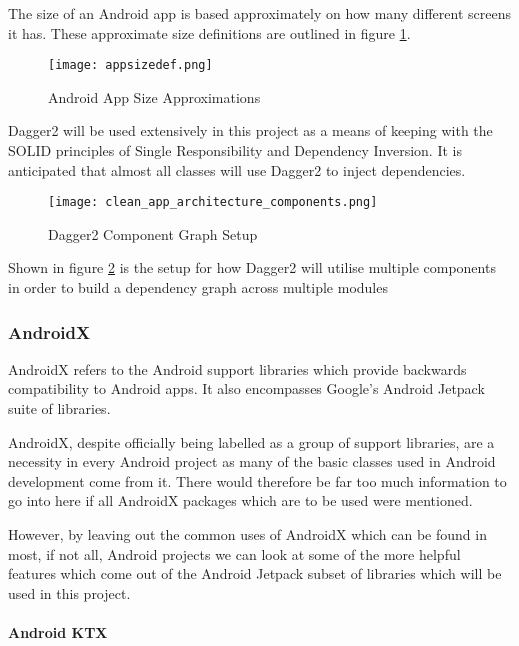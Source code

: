 The size of an Android app is based approximately on how many different screens it has. These approximate size definitions are outlined in figure \ref{fig:androidappsizes}.

\begin{figure}[ht]
  \centering
      \texttt{[image: appsizedef.png]}
  \caption[Android App Size Approximations]{Android App Size Approximations\cite{androiddi}}
  \label{fig:androidappsizes}
\end{figure}

Dagger2 will be used extensively in this project as a means of keeping with the SOLID principles of Single Responsibility and Dependency Inversion. It is anticipated that almost all classes will use Dagger2 to inject dependencies.

\begin{figure}[ht]
  \centering
      \texttt{[image: clean\_app\_architecture\_components.png]}
  \caption[Dagger2 Component Graph Setup]{Dagger2 Component Graph Setup\cite{teamworkcleanarchitecture}}
  \label{fig:cleanarchitecturedicomponents}
\end{figure}

Shown in figure \ref{fig:cleanarchitecturedicomponents} is the setup for how Dagger2 will utilise multiple components in order to build a dependency graph across multiple modules

\subsubsection{AndroidX}

AndroidX refers to the Android support libraries which provide backwards compatibility to Android apps. It also encompasses Google's Android Jetpack suite of libraries.

AndroidX, despite officially being labelled as a group of support libraries, are a necessity in every Android project as many of the basic classes used in Android development come from it. There would therefore be far too much information to go into here if all AndroidX packages which are to be used were mentioned.

However, by leaving out the common uses of AndroidX which can be found in most, if not all, Android projects we can look at some of the more helpful features which come out of the Android Jetpack subset of libraries which will be used in this project.

\paragraph{Android KTX}

